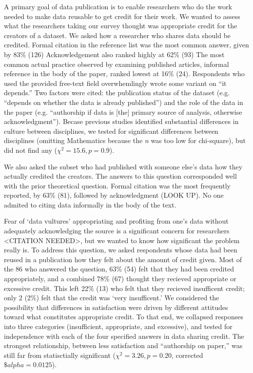 \documentclass[10pt]{article}
\begin{document}
A primary goal of data publication is to enable researchers who do the work needed to make data reusable to get credit for their work.
We wanted to assess what the researchers taking our survey thought was appropriate credit for the creators of a dataset.
We asked how a researcher who shares data should be credited.
Formal citation in the reference list was the most common answer, given by 83\% (126)
Acknowledgement also ranked highly at 62\% (93)
The most common actual practice observed by examining published articles, informal reference in the body of the paper\cite{sieber_not_1995, mooney_anatomy_2012}, ranked lowest at 16\% (24).
Respondents who used the provided free-text field overwhemlingly wrote some variant on ``it depends.''
Two factors were cited: the publication status of the dataset (e.g. ``depends on whether the data is already published'') and the role of the data in the paper (e.g. ``authorship if data is [the] primary source of analysis, otherwise acknowledgment'').
Becase previous studies identified substantial differences in culture between disciplines\cite{harley_assessing_2010, swan_share_2008}, we tested for significant differences between disciplines (omitting Mathematics because the \emph{n} was too low for chi-square), but did not find any ($\chi^{2}= 15.6, p= 0.9$).

We also asked the subset who had published with someone else's data how they actually credited the creators.
The answers to this question corresponded well with the prior theoretical question.
Formal citation was the most frequently reported, by 63\% (81), followed by acknowledgment (LOOK UP).
No one admited to citing data informally in the body of the text.

Fear of `data vultures' appropriating and profiting from one's data without adequately acknowledging the source is a significant concern for researchers <CITATION NEEDED>, but we wanted to know how significant the problem really is.
To address this question, we asked respondents whose data had been reused in a publication how they felt about the amount of credit given.
Most of the 86 who answered the question, 63\% (54) felt that they had been credited appropriately, and a combined 78\% (67) thought they recieved appropriate or excessive credit.
This left 22\% (13) who felt that they recieved insufficent credit; only 2 (2\%) felt that the credit was `very insufficent.'
We considered the possibility that differences in satisfaction were driven by different attitudes toward what constitutes appropriate credit.  
To that end, we collapsed responses into three categories (insufficient, appropriate, and excessive), and tested for independence with each of the four specified answers in data sharing credit.
The strongest relationship, between less satisfaction and ``authorship on paper,'' was still far from statisctially significant ($\chi^{2}= 3.26, p= 0.20$, corrected $\$alpha= 0.0125$).
\end{document}

